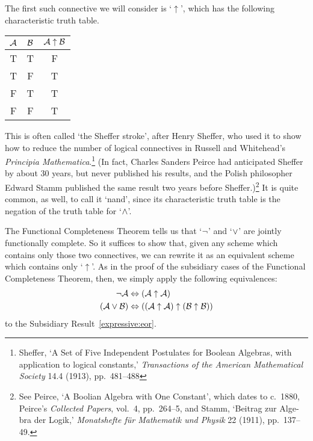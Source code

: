The first such connective we will consider is `$\uparrow$', which has the following characteristic truth table.
\begin{center}
\begin{tabular}{c c | c}
$\mathcal{A}$ & $\mathcal{B}$ & $\mathcal{A} \mathrel{\uparrow} \mathcal{B}$\\
\hline
 T & T & F \\
 T & F & T \\
 F & T & T  \\
 F & F & T
\end{tabular}
\end{center}
 This is often called `the Sheffer stroke', after Henry Sheffer, who used it to show how to reduce the number of logical connectives in Russell and Whitehead's \textit{Principia Mathematica}.\footnote{Sheffer, `A Set of Five Independent Postulates for Boolean Algebras, with application to logical constants,' \textit{Transactions of the American Mathematical Society} 14.4 (1913), pp.~481--488} (In fact, Charles Sanders Peirce had anticipated Sheffer by about 30 years, but never published his results, and the Polish philosopher Edward Stamm published the same result two years before Sheffer.)\footnote{See Peirce, `A Boolian Algebra with One Constant', which dates to c.~1880, Peirce's \textit{Collected Papers}, vol.~4, pp.~264--5, and Stamm, `\foreignlanguage{german}{Beitrag zur Algebra der Logik},' \foreignlanguage{german}{\textit{Monatshefte für Mathematik und Physik}} 22 (1911), pp.~137--49.} It is quite common, as well, to call it `nand', since its characteristic truth table is the negation of the truth table for `$\wedge$'.

The Functional Completeness Theorem tells us that `$\neg$' and `$\vee$' are jointly functionally complete. So it suffices to show that, given any scheme which contains only those two connectives, we can rewrite it as an equivalent scheme which contains only `$\uparrow$'. As in the proof of the subsidiary cases of the Functional Completeness Theorem, then, we simply apply the following equivalences:
		\begin{align*}
			\neg \mathcal{A} &\Leftrightarrow (\mathcal{A} \uparrow \mathcal{A})\\
			(\mathcal{A} \vee \mathcal{B}) & \Leftrightarrow ((\mathcal{A} \uparrow \mathcal{A}) \uparrow (\mathcal{B} \uparrow \mathcal{B}))
		\end{align*}
to the Subsidiary Result~\ref*{expressive:eor}.

